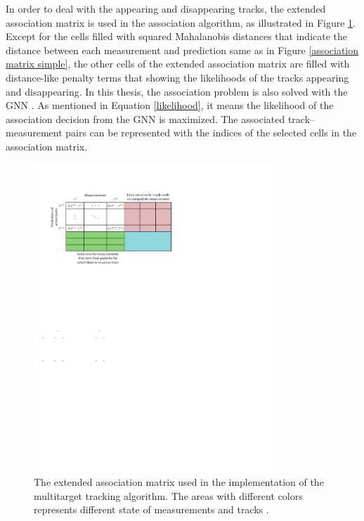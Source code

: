 In order to deal with the appearing and disappearing tracks, the extended association matrix is used in the association algorithm, as illustrated in Figure \ref{association matrix}. Except for the cells filled with squared Mahalanobis distances that indicate the distance between each measurement and prediction same as in Figure \ref{association matrix simple}, the other cells of the extended association matrix are filled with distance-like penalty terms that showing the likelihoods of the tracks appearing and disappearing. In this thesis, the association problem is also solved with the GNN \cite{pfaff2019multitarget}. As mentioned in Equation \eqref{likelihood}, it means the likelihood of the association decision from the GNN is maximized. The associated track–measurement pairs can be represented with the indices of the selected cells in the association matrix.



\begin{figure}[htb]
\centering
\includegraphics[width=0.8\textwidth]{figures/asso matrix.pdf}
\caption{The extended association matrix used in the implementation of the multitarget tracking algorithm. The areas with different colors represents different state of measurements and tracks \cite{pfaff2019multitarget}.}
\label{association matrix}
\end{figure}


